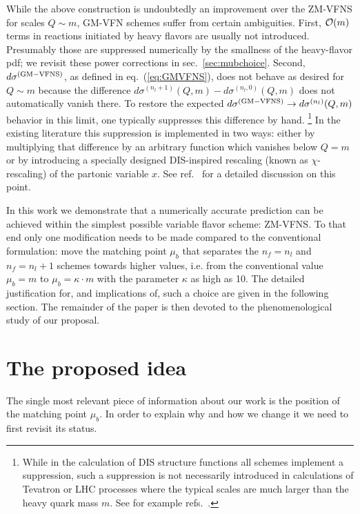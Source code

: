 \documentclass[letter,11pt]{article}
\def\nf{{n_f}}
\def\nl{{n_l}}
\def\mub{\mu_b}
\begin{document}
While the above construction is undoubtedly an improvement over the ZM-VFNS for scales $Q\sim m$, GM-VFN schemes suffer from certain ambiguities. First, ${\cal O}(m)$ terms in reactions initiated by heavy flavors are usually not introduced. Presumably those are suppressed numerically by the smallness of the heavy-flavor pdf; we revisit these power corrections in sec.~\ref{sec:mubchoice}. Second, $d\sigma^{\rm (GM-VFNS)}$, as defined in eq.~(\ref{eq:GMVFNS}), does not behave as desired for $Q\sim m$ because the difference $d\sigma^{(\nl+1)}(Q,m) - d\sigma^{(\nl,0)}(Q,m)$ does not automatically vanish there. To restore the expected $d\sigma^{\rm (GM-VFNS)}\to d\sigma^{(\nl)}(Q,m)$ behavior in this limit, one typically suppresses this difference by hand.
%
\footnote{While in the calculation of DIS structure functions all schemes implement a suppression, such a suppression is not necessarily introduced in calculations of Tevatron or LHC processes where the typical scales are much larger than the heavy quark mass $m$. See for example refs.~\cite{Campbell:2003dd,Forte:2015hba,Bonvini:2015pxa,Forte:2016sja,Bonvini:2016fgf}.}
%
In the existing literature this suppression is implemented in two ways: either by multiplying that difference by an arbitrary function which vanishes below $Q=m$ or by introducing a specially designed DIS-inspired rescaling (known as $\chi$-rescaling) of the partonic variable $x$. See ref.~\cite{Forte:2010ta} for a detailed discussion on this point.

In this work we demonstrate that a numerically accurate prediction can be achieved within the simplest possible variable flavor scheme: ZM-VFNS. To that end only one modification needs to be made compared to the conventional formulation: move the matching point $\mub$ that separates the $\nf=\nl$ and $\nf=\nl+1$ schemes towards higher values, i.e. from the conventional value $\mub=m$ to $\mub=\kappa \cdot m$ with the parameter $\kappa$ as high as 10. The detailed justification for, and implications of, such a choice are given in the following section. The remainder of the paper is then devoted to the phenomenological study of our proposal.




\section{The proposed idea}\label{sec:idea}


The single most relevant piece of information about our work is the position of the matching point $\mub$. In order to explain why and how we change it we need to first revisit its status. 
\end{document}
